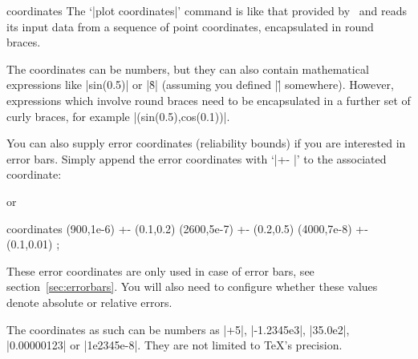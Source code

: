 \begin{addplotoperation}[]{coordinates}{}
\label{pgfplots:addplot:coordinates}
The `|plot coordinates|' command is like that provided by \Tikz\ and reads its input data from a sequence of point coordinates, encapsulated in round braces.
\begin{codeexample}[]
\end{codeexample}
\noindent The coordinates can be numbers, but they can also contain mathematical expressions like |sin(0.5)| or |\h*8| (assuming you defined |\h| somewhere). However, expressions which involve round braces need to be encapsulated in a further set of curly braces, for example |({sin(0.5)},{cos(0.1)})|.

You can also supply error coordinates (reliability bounds) if you are interested in error bars. Simply append the error coordinates with `|+- |' to the associated coordinate:
\begin{codeexample}[]
\end{codeexample}
or 
\begin{codeexample}
\addplot coordinates {
	 (900,1e-6) +- (0.1,0.2)
	(2600,5e-7) +- (0.2,0.5)
	(4000,7e-8) +- (0.1,0.01)
};
\end{codeexample}
These error coordinates are only used in case of error bars, see section~\ref{sec:errorbars}. You will also need to configure whether these values denote absolute or relative errors.

The coordinates as such can be numbers as |+5|, |-1.2345e3|, |35.0e2|, |0.00000123| or |1e2345e-8|. They are not limited to \TeX's precision.


\end{addplotoperation}
